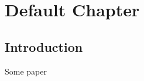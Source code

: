\documentclass[letterpaper]{report}
\begin{document}
    \pagestyle{fancy}

    \thispagestyle{empty}

    \begin{titlepage}
        \maketitle
    \end{titlepage}

	\begin{abstract}
		\lipsum[1]
    \end{abstract}
    
    \tableofcontents

    \chapter{Default Chapter}
	
	\section{Introduction}
	
	\lipsum[10]

	\medskip


	Some paper \cite{einstein, dirac}

	\printbibliography


	\lipsum[1]

	\inputminted{octave}{codes/default.py}
\end{document}
